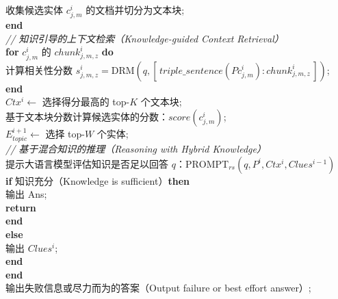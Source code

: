 \documentclass[11pt,UTF8,fontset=fandol]{ctexart}
\begin{document}
\begin{algobox}
\hspace*{2em}收集候选实体 $c^{i}_{j,m}$ 的文档并切分为文本块;\\
\hspace*{1em}\textbf{end}\\
\hspace*{1em}\textit{// 知识引导的上下文检索（Knowledge-guided Context Retrieval）}\\
\hspace*{1em}\textbf{for} $c^{i}_{j,m}$ 的 $chunk^{i}_{j,m,z}$ \textbf{do}\\
\hspace*{2em}计算相关性分数 $s^{i}_{j,m,z}=\mathrm{DRM}(q,[\,triple\_sentence(Pc^{i}_{j,m}):chunk^{i}_{j,m,z}\,])$;\\
\hspace*{1em}\textbf{end}\\
\hspace*{1em}$Ctx^{i}\leftarrow$ 选择得分最高的 top-$K$ 个文本块;\\
\hspace*{1em}基于文本块分数计算候选实体的分数：$score(c^{i}_{j,m})$;\\
\hspace*{1em}$E^{i+1}_{topic}\leftarrow$ 选择 top-$W$ 个实体;\\
\hspace*{1em}\textit{// 基于混合知识的推理（Reasoning with Hybrid Knowledge）}\\
\hspace*{1em}提示大语言模型评估知识是否足以回答 $q$：$\mathrm{PROMPT}_{rs}(q,P^{i},Ctx^{i},Clues^{i-1})$\\
\hspace*{1em}\textbf{if} 知识充分（Knowledge is sufficient）\textbf{then}\\
\hspace*{2em}输出 Ans;\\
\hspace*{2em}\textbf{return}\\
\hspace*{1em}\textbf{end}\\
\hspace*{1em}\textbf{else}\\
\hspace*{2em}输出 $Clues^{i}$;\\
\hspace*{1em}\textbf{end}\\
\textbf{end}\\
输出失败信息或尽力而为的答案（Output failure or best effort answer）;
\end{algobox}
\end{document}

